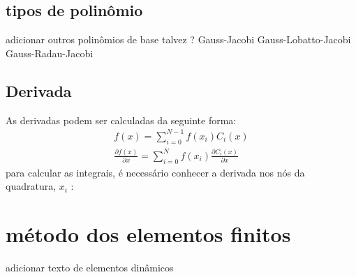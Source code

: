 \subsection{tipos de polinômio}
	adicionar outros polinômios de base talvez ?
	Gauss-Jacobi
	Gauss-Lobatto-Jacobi
	Gauss-Radau-Jacobi 


\subsection{Derivada}
	As derivadas podem ser calculadas da seguinte forma:
	\begin{align}
	f(x) = \sum^{N-1}_{i=0} f(x_i) C_i(x)\\
	\frac{\partial f(x)}{\partial x} = \sum^{N}_{i = 0} f(x_i) \frac{\partial C_i(x)}{\partial x}
	\end{align}
	para calcular as integrais, é necessário conhecer a derivada nos nós da quadratura, $x_i$ :

\section{método dos elementos finitos}
adicionar texto de elementos dinâmicos